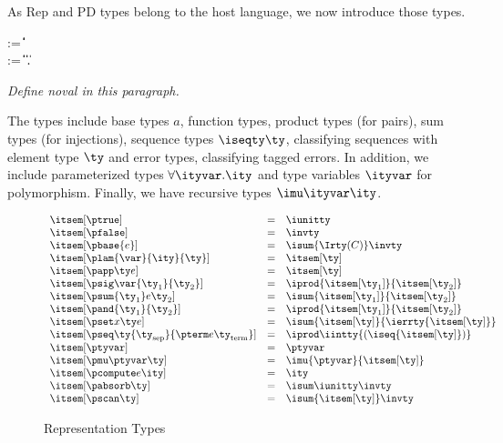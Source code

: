 As \implang{} Rep and PD types belong to the host language, we now
introduce those types.

\begin{bnf}
    \::= 
  \iboolty \| \iintty \| \iunitty \| 
  \invty \nlalt \iecty \| \ioffty \| \ibitsty
  \\
   \meta{\ity} \::= 
      \ibasety \| \iarrow \ity \ity \| \iprod \ity \ity \|
      \isum \ity \ity \nlalt
      \iseq \ity \|
      \ierrty \ity \| \forall \ityvar.\ity  \| \ityvar \nlalt
      \imu \ityvar \ity   
\end{bnf}

{\em Define noval in this paragraph.}

The types include base types $a$, function types, product types (for
pairs), sum types (for injections), sequence types $\iseqty \ty$,
classifying sequences with element type $\ty$ and error types,
classifying tagged errors. In addition, we include parameterized types
$\forall \ityvar.\ity$ and type variables $\ityvar$ for polymorphism.
Finally, we have recursive types $\imu \ityvar \ity$.

\begin{figure}
\fbox{$\itsem[\ty] = \ity$}
\[
\begin{array}{lcl} 
\itsem[\ptrue] & = & \iunitty \\
\itsem[\pfalse] & = & \invty \\
\itsem[\pbase{e}] & = & \isum {\Irty(C)} \invty   \\
\itsem[\plam{\var}{\ity}{\ty}] & = & \itsem[\ty] \\
\itsem[\papp \ty e] & = & \itsem[\ty] \\
\itsem[\psig \var {\ty_1} {\ty_2}]  & = & \iprod {\itsem[\ty_1]} {\itsem[\ty_2]}    \\
\itsem[\psum {\ty_1} e {\ty_2}]     & = & \isum {\itsem[\ty_1]} {\itsem[\ty_2]} \\
\itsem[\pand {\ty_1} {\ty_2}]  & = & \iprod {\itsem[\ty_1]}{\itsem[\ty_2]}\\
\itsem[\pset x \ty e] & = & \isum {\itsem[\ty]}{\ierrty {\itsem[\ty]}}\\
\itsem[\pseq \ty {\ty_{\text{sep}}} {\pterm e {\ty_{\text{term}}}}] & = & 
    \iprod \iintty {(\iseq{\itsem[\ty]})}             \\
\itsem[\ptyvar] & = & \ptyvar \\
\itsem[\pmu \ptyvar \ty] & = & \imu{\ptyvar}{\itsem[\ty]} \\
\itsem[\pcompute e \ity]                 & = & \ity \\
\itsem[\pabsorb \ty]                     & = & \isum \iunitty \invty \\
\itsem[\pscan \ty] & = & \isum {\itsem[\ty]} \invty 
\end{array}
\]
\label{fig:rep-tys}
\caption{Representation Types}
\end{figure}


